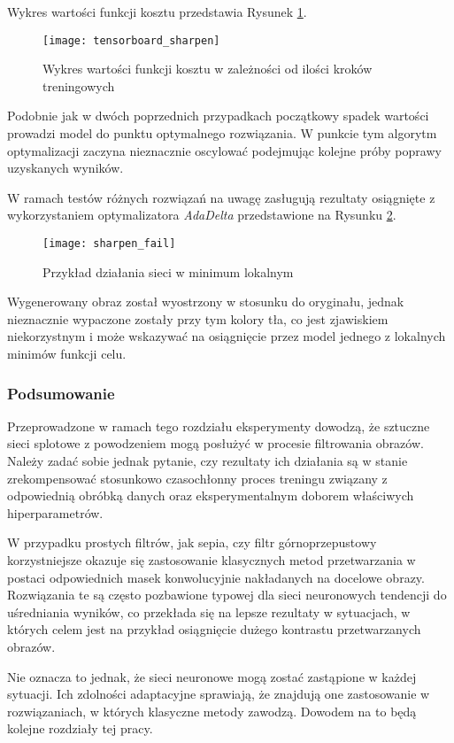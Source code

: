     Wykres wartości funkcji kosztu przedstawia Rysunek \ref{fig:tensorboard_sharpen}.

    \begin{figure}[H]
      \centering
      \texttt{[image: tensorboard\_sharpen]}
      \caption[Wykres wartości funkcji kosztu w zależności od ilości kroków treningowych - źródło: Rysunek własny]{Wykres wartości funkcji kosztu w zależności od ilości kroków treningowych}
      \label{fig:tensorboard_sharpen}
    \end{figure}

    Podobnie jak w dwóch poprzednich przypadkach początkowy spadek wartości
    prowadzi model do punktu optymalnego rozwiązania. W punkcie tym algorytm optymalizacji
    zaczyna nieznacznie oscylować podejmując kolejne próby poprawy uzyskanych wyników.

    W ramach testów różnych rozwiązań na uwagę zasługują rezultaty osiągnięte
    z wykorzystaniem optymalizatora \textit{AdaDelta} przedstawione na Rysunku \ref{fig:sharpen_fail}.

    \begin{figure}[H]
      \centering
      \texttt{[image: sharpen\_fail]}
      \caption[Przykład działania sieci w minimum lokalnym - źródło: Rysunek własny]{Przykład działania sieci w minimum lokalnym}
      \label{fig:sharpen_fail}
    \end{figure}

    Wygenerowany obraz został wyostrzony w stosunku do oryginału, jednak
    nieznacznie wypaczone zostały przy tym kolory tła, co jest zjawiskiem niekorzystnym i
    może wskazywać na osiągnięcie przez model jednego z lokalnych minimów funkcji celu.

  \subsubsection{Podsumowanie}

    Przeprowadzone w ramach tego rozdziału eksperymenty dowodzą, że sztuczne
    sieci splotowe z powodzeniem mogą posłużyć w procesie filtrowania obrazów.
    Należy zadać sobie jednak pytanie, czy rezultaty ich działania są w stanie
    zrekompensować stosunkowo czasochłonny proces treningu związany z odpowiednią
    obróbką danych oraz eksperymentalnym doborem właściwych hiperparametrów.

    W przypadku prostych filtrów, jak sepia, czy filtr górnoprzepustowy korzystniejsze
    okazuje się zastosowanie klasycznych metod przetwarzania w postaci
    odpowiednich masek konwolucyjnie nakładanych na docelowe obrazy. Rozwiązania te
    są często pozbawione typowej dla sieci neuronowych tendencji do uśredniania
    wyników, co przekłada się na lepsze rezultaty w sytuacjach, w których celem jest
    na przykład osiągnięcie dużego kontrastu przetwarzanych obrazów.

    Nie oznacza to jednak, że sieci neuronowe mogą zostać zastąpione w każdej sytuacji.
    Ich zdolności adaptacyjne sprawiają, że znajdują one zastosowanie w rozwiązaniach, w
    których klasyczne metody zawodzą. Dowodem na to będą kolejne rozdziały tej pracy.

